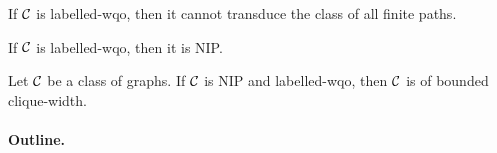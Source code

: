 \begin{remark}
    \label{transductions-paths:rem}
    If $\mathcal{C}$ is labelled-wqo, then it cannot transduce
    the class of all finite paths.
\end{remark}

\begin{remark}
    If $\mathcal{C}$ is labelled-wqo, then it is NIP.
\end{remark}

\begin{conjecture}
    \label{nip-cw:conj}
    Let $\mathcal{C}$ be a class of graphs.
    If $\mathcal{C}$ is NIP and labelled-wqo,
    then $\mathcal{C}$ is of bounded clique-width.
\end{conjecture}

\paragraph*{Outline.}
